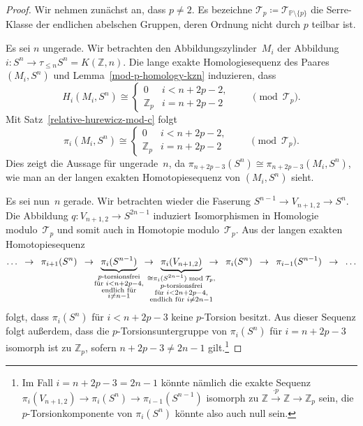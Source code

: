 \documentclass[11pt, a4paper, german]{article}
\theoremstyle{definition}
\theoremstyle{remark}
\newcommand{\R}{\mathbb{R}} %
\newcommand{\Z}{\mathbb{Z}} %
\newcommand{\T}{\mathcal{T}} %
\newcommand{\V}[2]{V_{{#2},{#1}}} %
\newcommand{\Primes}{\mathbb{P}} %
\begin{document}
\begin{proof}
  Wir nehmen zunächst an, dass $p \neq 2$.
  Es bezeichne $\T_p \coloneqq \T_{\Primes \setminus \{ p \}}$ die Serre-Klasse der endlichen abelschen Gruppen, deren Ordnung nicht durch $p$ teilbar ist.

  Es sei $n$ ungerade.
  Wir betrachten den Abbildungszylinder~$M_i$ der Abbildung $i : S^n \to \tau_{\leq n} S^n = K(\Z, n)$.
  Die lange exakte Homologiesequenz des Paares $(M_i, S^n)$ und Lemma~\ref{mod-p-homology-kzn} induzieren, dass
  \[
   H_i(M_i, S^n) \cong \begin{cases}
     0 & i < n + 2p - 2, \\
     \Z_p & i = n + 2p - 2
   \end{cases}
   \qquad \pmod{\T_p}.
  \]
  Mit Satz~\ref{relative-hurewicz-mod-c} folgt
  \[
   \pi_i(M_i, S^n) \cong \begin{cases}
     0 & i < n + 2p - 2, \\
     \Z_p & i = n + 2p - 2
   \end{cases}
   \qquad \pmod{\T_p}.
  \]
  Dies zeigt die Aussage für ungerade~$n$, da $\pi_{n+2p-3}(S^n) \cong \pi_{n+2p-3}(M_i, S^n)$, wie man an der langen exakten Homotopiesequenz von $(M_i, S^n)$ sieht.

  Es sei nun~$n$ gerade.
  Wir betrachten wieder die Faserung $S^{n-1} \to \V{2}{n+1} \to S^n$.
  Die Abbildung $q : \V{2}{n+1} \to S^{2n-1}$ induziert Isomorphismen in Homologie modulo~$\T_p$ und somit auch in Homotopie modulo~$\T_p$.
  Aus der langen exakten Homotopiesequenz
  \[
    \ldots
    \enspace\to\enspace
    \pi_{i+1}(S^n)
    \enspace\to\enspace
    \underbrace{\pi_i(S^{n-1})}_{\mathclap{\substack{\text{$p$-torsionsfrei} \\ \text{für } i < n + 2p - 4, \\ \text{endlich für} \\ i \neq n-1}}}
    \enspace\to\enspace \underbrace{\pi_i(\V{2}{n+1})}_{\mathclap{\substack{\cong \pi_i(S^{2n-1}) \bmod{\T_p}, \\ \text{$p$-torsionsfrei} \\ \text{für } i < 2n + 2p - 4, \\ \text{endlich für } i \neq 2n-1}}}
    \enspace\to\enspace
    \pi_i(S^n)
    \enspace\to\enspace
    \pi_{i-1}(S^{n-1})
    \enspace\to\enspace
    \ldots
  \]
  folgt, dass $\pi_i(S^n)$ für $i < n + 2p - 3$ keine $p$-Torsion besitzt.
  Aus dieser Sequenz folgt außerdem, dass die $p$-Torsionsuntergruppe von $\pi_i(S^n)$ für $i = n + 2p - 3$ isomorph ist zu $\Z_p$, sofern $n + 2p - 3 \neq 2n - 1$ gilt.\footnote{
    Im Fall $i = n + 2p - 3 = 2n - 1$ könnte nämlich die exakte Sequenz $\pi_i(\V{2}{n+1}) \to \pi_i(S^n) \to \pi_{i-1}(S^{n-1})$ isomorph zu $\Z \xrightarrow{\cdot p} \Z \to \Z_p$ sein, die $p$-Torsionkomponente von $\pi_i(S^n)$ könnte also auch null sein.
  }


\end{proof}
\end{document}
